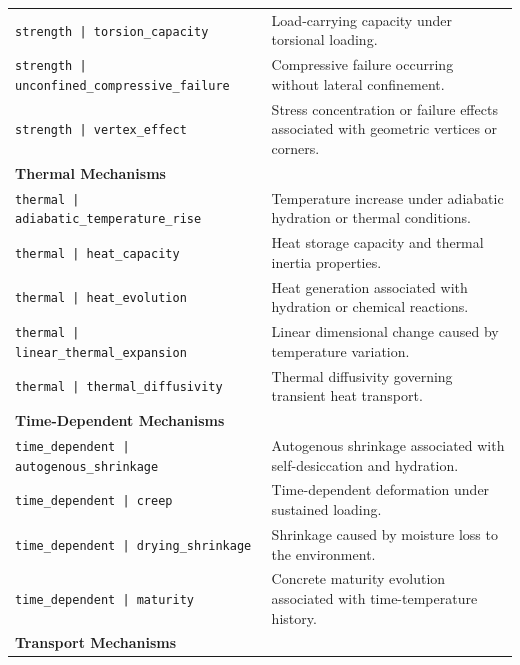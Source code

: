 \documentclass[11pt]{book}
\begin{document}
{\begin{longtable}{p{}p{}}
\texttt{strength | torsion\_capacity} &
Load-carrying capacity under torsional loading. \\

\texttt{strength | unconfined\_compressive\_failure} &
Compressive failure occurring without lateral confinement. \\

\texttt{strength | vertex\_effect} &
Stress concentration or failure effects associated with geometric vertices or corners. \\

\hline
\multicolumn{2}{l}{\textbf{Thermal Mechanisms}}\\
\hline

\texttt{thermal | adiabatic\_temperature\_rise} &
Temperature increase under adiabatic hydration or thermal conditions. \\

\texttt{thermal | heat\_capacity} &
Heat storage capacity and thermal inertia properties. \\

\texttt{thermal | heat\_evolution} &
Heat generation associated with hydration or chemical reactions. \\

\texttt{thermal | linear\_thermal\_expansion} &
Linear dimensional change caused by temperature variation. \\

\texttt{thermal | thermal\_diffusivity} &
Thermal diffusivity governing transient heat transport. \\

\hline
\multicolumn{2}{l}{\textbf{Time-Dependent Mechanisms}}\\
\hline

\texttt{time\_dependent | autogenous\_shrinkage} &
Autogenous shrinkage associated with self-desiccation and hydration. \\

\texttt{time\_dependent | creep} &
Time-dependent deformation under sustained loading. \\

\texttt{time\_dependent | drying\_shrinkage} &
Shrinkage caused by moisture loss to the environment. \\

\texttt{time\_dependent | maturity} &
Concrete maturity evolution associated with time-temperature history. \\

\hline
\multicolumn{2}{l}{\textbf{Transport Mechanisms}}\\
\hline


\end{longtable}}
\end{document}
